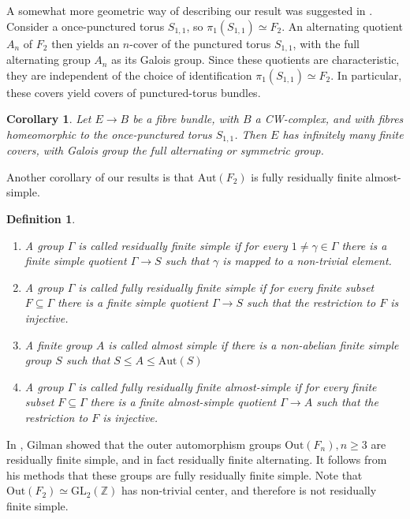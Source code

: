 \documentclass[letterpaper]{amsart}
\newtheorem{definition}[theorem]{Definition}
\newtheorem{corollary}[theorem]{Corollary}
\begin{document}
A somewhat more geometric way of describing our result was suggested in \cite[Remark 2.2.1]{chen2025finite}. Consider a once-punctured torus $S_{1,1}$, so $\pi_1(S_{1,1}) \simeq F_2$. An alternating quotient $A_n$ of $F_2$ then yields an $n$-cover of the punctured torus $S_{1,1}$, with the full alternating group $A_n$ as its Galois group. Since these quotients are characteristic, they are independent of the choice of identification $\pi_1(S_{1,1}) \simeq F_2$. In particular, these covers yield covers of punctured-torus bundles.
\begin{corollary}
\label{covering torus bundles}
Let $E \to B$ be a fibre bundle, with $B$ a CW-complex, and with fibres homeomorphic to the once-punctured torus $S_{1,1}$. Then $E$ has infinitely many finite covers, with Galois group the full alternating or symmetric group.
\end{corollary}
Another corollary of our results is that $\mathrm{Aut}(F_2)$ is fully residually finite almost-simple.
\begin{definition}
\begin{enumerate}
\item A group $\Gamma$ is called residually finite simple if for every $1 \neq \gamma \in \Gamma$ there is a finite simple quotient $\Gamma \to S$ such that $\gamma$ is mapped to a non-trivial element.
\item A group $\Gamma$ is called fully residually finite simple if for every finite subset $F \subseteq \Gamma$ there is a finite simple quotient $\Gamma \to S$ such that the restriction to $F$ is injective.
\item A finite group $A$ is called almost simple if there is a non-abelian finite simple group $S$ such that $S \leq A \leq \mathrm{Aut}(S)$
\item A group $\Gamma$ is called fully residually finite almost-simple if for every finite subset $F \subseteq \Gamma$ there is a finite almost-simple quotient $\Gamma \to A$ such that the restriction to $F$ is injective.

\end{enumerate}
\end{definition}
In \cite{gilman1977finite}, Gilman showed that the outer automorphism groups $\mathrm{Out}(F_n), n\geq 3$ are residually finite simple, and in fact residually finite alternating. It follows from his methods that these groups are fully residually finite simple. Note that $\mathrm{Out}(F_2) \simeq \mathrm{GL}_2(\mathbb{Z})$ has non-trivial center, and therefore is not residually finite simple.
\end{document}
